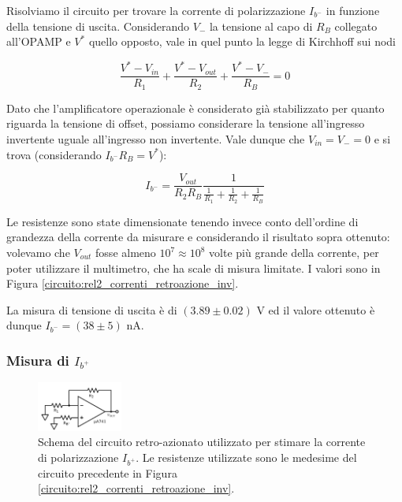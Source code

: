 Risolviamo il circuito per trovare la corrente di polarizzazione $I_{b^-}$ in funzione della tensione di uscita. Considerando $V_{-}$ la tensione al capo di $R_B$ collegato all'OPAMP e $V^*$ quello opposto, vale in quel punto la legge di Kirchhoff sui nodi

$$\frac{V^* - V_{in}}{R_1} + \frac{V^*-V_{out}}{R_2} + \frac{V^*-V_{-}}{R_B}=0$$

Dato che l'amplificatore operazionale è considerato già stabilizzato per quanto riguarda la tensione di offset, possiamo considerare la tensione all'ingresso invertente uguale all'ingresso non invertente. Vale dunque che $V_{in}=V_{-}=0$ e si trova (considerando $I_{b^-} R_B = V^*$):

$$I_{b^-}=\frac{V_{out}}{R_2 R_B}\frac{1}{\frac{1}{R_1}+\frac{1}{R_2}+\frac{1}{R_B}}$$

Le resistenze sono state dimensionate tenendo invece conto dell'ordine di grandezza della corrente da misurare e considerando il risultato sopra ottenuto: volevamo che $V_{out}$ fosse almeno $10^7\approx10^8$ volte più grande della corrente, per poter utilizzare il multimetro, che ha scale di misura limitate. I valori sono in Figura \ref{circuito:rel2_correnti_retroazione_inv}.

La misura di tensione di uscita è di $(3.89\pm0.02)$ \si{\volt} ed il valore ottenuto è dunque $I_{b^-} = (38 \pm 5)$ \si{\nano\ampere}.

\subsubsection*{Misura di $I_{b^+}$}

\begin{figure}
  \begin{center}
    \includegraphics[width=0.25\textwidth]{../E02/latex/ninv_current.pdf}
  \end{center}
  \caption{Schema del circuito retro-azionato utilizzato per stimare la corrente di polarizzazione $I_{b^+}$. Le resistenze utilizzate sono le medesime del circuito precedente in Figura \ref{circuito:rel2_correnti_retroazione_inv}.}
  \label{circuito:rel2_correnti_retroazione_noninv}
\end{figure}


